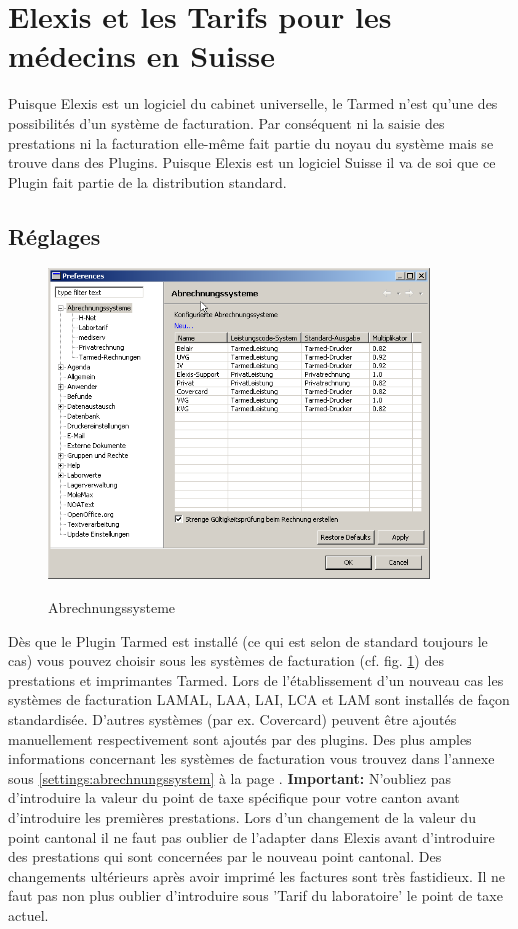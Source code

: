 \section{Elexis et les Tarifs pour les médecins en Suisse }
\label{arzttarife}
Puisque Elexis est un logiciel du cabinet universelle, le Tarmed n'est qu'une des possibilités d'un système de facturation. Par conséquent ni la saisie des prestations ni la facturation elle-même fait partie du noyau du système mais se trouve dans des Plugins. Puisque Elexis est un logiciel Suisse il va de soi que ce Plugin fait partie de la distribution standard.
\subsection{Réglages}
\begin{figure}
  \center
  \includegraphics[width=0.9\textwidth]{images/arztrechnung1}\\
  \caption{Abrechnungssysteme}\label{fig:tarmed1}
\end{figure}

Dès que le Plugin Tarmed est installé (ce qui est selon de standard toujours le cas) vous pouvez choisir sous les systèmes de facturation  (cf. fig. \ref{fig:tarmed1}) des prestations et imprimantes Tarmed. Lors de l'établissement d'un nouveau cas les systèmes de facturation LAMAL, LAA, LAI, LCA et LAM sont installés de façon standardisée. D'autres systèmes (par ex. Covercard) peuvent être ajoutés manuellement respectivement sont ajoutés par des plugins. Des plus amples informations concernant les systèmes de facturation vous trouvez dans l'annexe sous \ref{settings:abrechnungssystem} à la page \pageref{settings:abrechnungssystem}. \textbf{Important:} N'oubliez pas d'introduire la valeur du point de taxe spécifique pour votre canton avant d'introduire les premières prestations.  Lors d'un changement de la valeur du point cantonal il ne faut pas oublier de l'adapter dans Elexis avant d'introduire des prestations qui sont concernées par le nouveau point cantonal. Des changements ultérieurs après avoir imprimé les factures sont très fastidieux. Il ne faut pas non plus oublier d'introduire sous 'Tarif du laboratoire' le point de taxe actuel.

